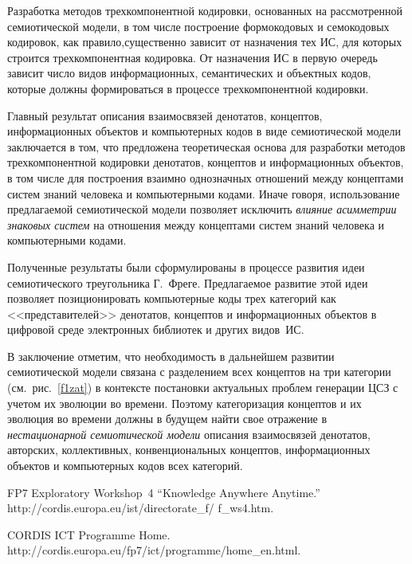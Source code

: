 \begin{multicols}{2}
   Разработка методов трехкомпонентной кодировки, основанных на рассмотренной 
семиоти\-ческой модели, в том числе построение формокодовых и семокодовых кодировок, 
как правило,\linebreak существенно зависит от назначения тех ИС, для которых строится 
трехкомпонентная кодировка. От назначения ИС в первую очередь зависит число видов 
информационных, семантических и объектных кодов, которые должны формироваться в 
процессе трехкомпонентной кодировки.
   
   Главный результат описания взаимосвязей денотатов, концептов, информационных 
объектов и компьютерных кодов в виде семиотической модели заключается в том, что 
предложена теоретическая основа для разработки методов трехкомпонентной кодировки 
денотатов, концептов и информационных объектов, в том числе для построения взаимно 
однозначных отношений между концептами систем знаний человека и компьютерными 
кодами. Иначе говоря, использование предлагаемой семиотической модели позволяет 
исключить \textit{влияние асимметрии знаковых систем} на отношения между концептами 
систем знаний человека и компьютерными кодами.
   
   Полученные результаты были сформулированы в процессе развития идеи семиотического 
треугольника Г.~Фреге. Предлагаемое развитие этой идеи позволяет позиционировать 
компьютерные коды трех категорий как <<представителей>> денотатов, концептов и 
информационных объектов в цифровой среде электронных библиотек и других видов~ИС.
   
   В заключение отметим, что необходимость в дальнейшем развитии семиотической 
модели связана с разделением всех концептов на три категории (см.\ рис.~\ref{f1zat}) в 
контексте постановки актуальных проблем генерации ЦСЗ с учетом их эволюции во 
времени. Поэтому категоризация концептов и их эволюция во времени должны в будущем 
найти свое отражение в \textit{нестационарной семиотической модели} описания 
взаимосвязей денотатов, авторских, коллективных, конвенциональных концептов, 
информационных объектов и компьютерных кодов всех категорий.


{\small\frenchspacing
{%
\begin{thebibliography}{99}    
FP7 Exploratory Workshop~4 ``Knowledge Anywhere Anytime.'' 
{\sf http://cordis.europa.eu/ist/directorate\_f/ f\_ws4.htm}.

     CORDIS ICT Programme Home. {\sf 
http://cordis.europa.\newline eu/fp7/ict/programme/home\_en.html}.
     

\end{thebibliography}}}
\end{multicols}
